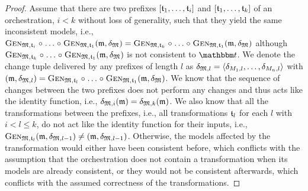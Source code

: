\begin{proof}
    Assume that there are two prefixes $\sequenced{\transformation{t}_{1}, \dots, \transformation{t}_{i}}$ and $\sequenced{\transformation{t}_{1}, \dots, \transformation{t}_{k}}$ of an orchestration, $i < k$ without loss of generality, such that they yield the same inconsistent models, i.e., $\generalizationfunction{\metamodeltuple{M}, \transformation{t}_{i}} \concatfunction \dots \concatfunction \generalizationfunction{\metamodeltuple{M}, \transformation{t}_{1}}(\modeltuple{m}, \changetuple{\metamodeltuple{M}}) = \generalizationfunction{\metamodeltuple{M}, \transformation{t}_{k}} \concatfunction \dots \concatfunction \generalizationfunction{\metamodeltuple{M}, \transformation{t}_{1}}(\modeltuple{m}, \changetuple{\metamodeltuple{M}})$ although $\generalizationfunction{\metamodeltuple{M}, \transformation{t}_{k}} \concatfunction \dots \concatfunction \generalizationfunction{\metamodeltuple{M}, \transformation{t}_{1}}(\modeltuple{m}, \changetuple{\metamodeltuple{M}})$ is not consistent to $\transformationset{T}$.
    We denote the change tuple delivered by any prefixes of length $l$ as $\changetuple{\metamodeltuple{M},l} = \tupled{\change{\metamodel{M}{1},l}, \dots, \change{\metamodel{M}{n}, l}}$ with $(\modeltuple{m}, \changetuple{\metamodeltuple{M},l}) = \generalizationfunction{\metamodeltuple{M}, \transformation{t}_{l}} \concatfunction \dots \concatfunction \generalizationfunction{\metamodeltuple{M}, \transformation{t}_{1}}(\modeltuple{m}, \changetuple{\metamodeltuple{M}})$.
    We know that the sequence of changes between the two prefixes does not perform any changes and thus acts like the identity function, i.e., %
    $\changetuple{\metamodeltuple{M},i}(\modeltuple{m}) = \changetuple{\metamodeltuple{M},k}(\modeltuple{m})$.
    We also know that all the transformations between the prefixes, i.e., all transformations $\transformation{t}_{l}$ for each $l$ with $i < l \leq k$, do not act like the identity function for their inputs, i.e., $\generalizationfunction{\metamodeltuple{M}, \transformation{t}_{l}}(\modeltuple{m}, \changetuple{\metamodeltuple{M},l-1}) \neq (\modeltuple{m}, \changetuple{\metamodeltuple{M},l-1})$.
    Otherwise, the models affected by the transformation would either have been consistent before, which conflicts with the assumption that the orchestration does not contain a transformation when its models are already consistent, or they would not be consistent afterwards, which conflicts with the assumed correctness of the transformations.


\end{proof}
